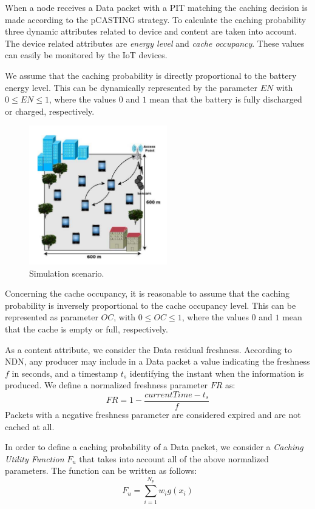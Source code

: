 \documentclass[conference]{IEEEtran}
\begin{document}
When a node receives a Data packet with a PIT matching the caching decision is made according to the pCASTING strategy.
To calculate the caching probability three dynamic attributes related to device and content are taken into account.
The device related attributes are \textit{energy level} and \textit{cache occupancy}. These values can easily be monitored by the
IoT devices.

We assume that the caching probability is directly proportional to the battery energy level. This can be dynamically represented by the 
parameter $EN$ with $0 \leq EN \leq 1$, where the values $0$ and $1$ mean that the battery is fully discharged or charged, respectively.

\begin{figure}[htbp]
    \centerline{\includegraphics[width=6cm]{fig1.png}}
    \caption{Simulation scenario.}
    \label{fig1}
\end{figure}
Concerning the cache occupancy, it is reasonable to assume that the caching probability is inversely proportional to the cache occupancy level.
This can be represented as parameter $OC$, with $0 \leq OC \leq 1$, where the values $0$ and $1$ mean that the cache is empty or full, respectively.

As a content attribute, we consider the Data residual freshness. According to NDN, any producer may include in a Data packet a value indicating the freshness $f$ in seconds,
and a timestamp $t_s$ identifying the instant when the information is produced. We define a normalized freshness parameter $FR$ as:
$$ FR = 1 - \frac{currentTime - t_s}{f}$$
Packets with a negative freshness parameter are considered expired and are not cached at all.

In order to define a caching probability of a Data packet, we consider a \textit{Caching Utility Function} $F_u$ that takes into account
all of the above normalized parameters. The function can be written as follows:
$$F_u = \sum_{i = 1}^{N_p} w_i g(x_i)$$
\end{document}
